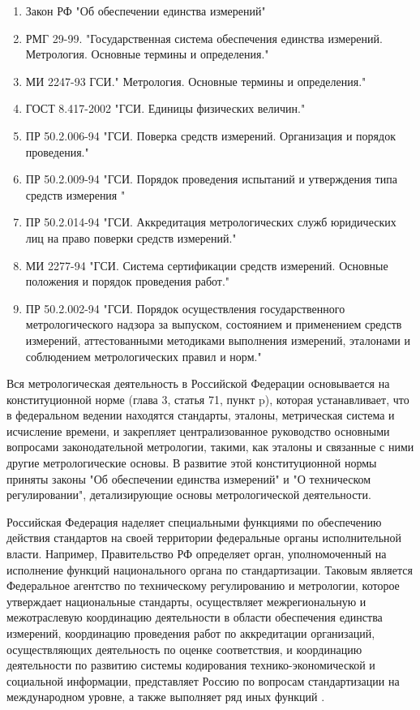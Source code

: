 \documentclass[14pt, a4paper] {ncc}
\begin{document}
	\begin{enumerate}
    	\item Закон РФ "Об обеспечении единства измерений"
    	\item РМГ 29-99. "Государственная система обеспечения единства измерений. Метрология. Основные термины и определения."
    	\item МИ 2247-93 ГСИ." Метрология. Основные термины и определения."
    	\item ГОСТ 8.417-2002 "ГСИ. Единицы физических величин."
    	\item ПР 50.2.006-94 "ГСИ. Поверка средств измерений. Организация и порядок проведения."
    	\item ПР 50.2.009-94 "ГСИ. Порядок проведения испытаний и утверждения типа средств измерения "
    	\item ПР 50.2.014-94 "ГСИ. Аккредитация метрологических служб юридических лиц на право поверки средств измерений."
    	\item МИ 2277-94 "ГСИ. Система сертификации средств измерений. Основные положения и порядок проведения работ."
    	\item ПР 50.2.002-94 "ГСИ. Порядок осуществления государственного метрологического надзора за выпуском, состоянием и применением средств измерений, аттестованными методиками выполнения измерений, эталонами и соблюдением метрологических правил и норм." \cite{micromake}
	\end{enumerate}

    Вся метрологическая деятельность в Российской Федерации основывается на
    конституционной норме (глава 3, статья 71, пункт p)\cite{const}, которая устанавливает, что в федеральном ведении находятся
    стандарты, эталоны, метрическая система и исчисление времени, и закрепляет
    централизованное руководство основными вопросами законодательной метрологии,
    такими, как эталоны и связанные с ними другие метрологические основы. В
    развитие этой конституционной нормы приняты законы "Об обеспечении единства
    измерений" и "О техническом регулировании", детализирующие основы метрологической
    деятельности. \cite{metrob1}


    Российская Федерация наделяет специальными функциями по обеспечению
    действия стандартов на своей территории федеральные органы исполнительной
    власти. Например, Правительство РФ определяет орган, уполномоченный на
    исполнение функций национального органа по стандартизации. Таковым является
    Федеральное агентство по техническому регулированию и метрологии,
	которое утверждает национальные стандарты,
    осуществляет межрегиональную и межотраслевую координацию деятельности
    в области обеспечения единства измерений, координацию проведения работ
    по аккредитации организаций, осуществляющих деятельность по оценке
    соответствия, и координацию деятельности по развитию системы кодирования
    технико-экономической и социальной информации, представляет Россию по
    вопросам стандартизации на международном уровне, а также выполняет ряд
    иных функций \cite{const}.
\end{document}
